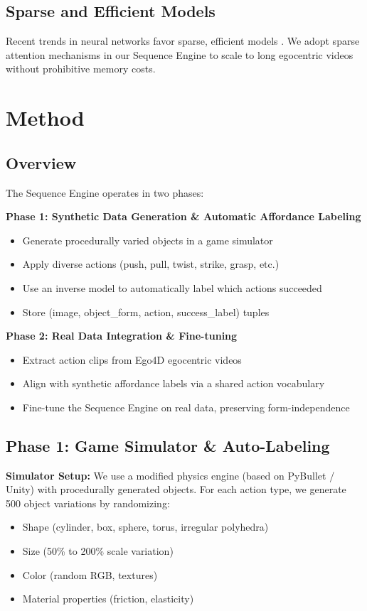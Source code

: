 \documentclass[11pt]{article}
\begin{document}
\subsection{Sparse and Efficient Models}

Recent trends in neural networks favor sparse, efficient models \cite{han2016deep, zhou2021efficient}. We adopt sparse attention mechanisms in our Sequence Engine to scale to long egocentric videos without prohibitive memory costs.

\section{Method}

\subsection{Overview}

The Sequence Engine operates in two phases:

\textbf{Phase 1: Synthetic Data Generation \& Automatic Affordance Labeling}
\begin{itemize}
    \item Generate procedurally varied objects in a game simulator
    \item Apply diverse actions (push, pull, twist, strike, grasp, etc.)
    \item Use an inverse model to automatically label which actions succeeded
    \item Store (image, object\_form, action, success\_label) tuples
\end{itemize}

\textbf{Phase 2: Real Data Integration \& Fine-tuning}
\begin{itemize}
    \item Extract action clips from Ego4D egocentric videos
    \item Align with synthetic affordance labels via a shared action vocabulary
    \item Fine-tune the Sequence Engine on real data, preserving form-independence
\end{itemize}

\subsection{Phase 1: Game Simulator \& Auto-Labeling}

\textbf{Simulator Setup:}
We use a modified physics engine (based on PyBullet / Unity) with procedurally generated objects. For each action type, we generate 500 object variations by randomizing:
\begin{itemize}
    \item Shape (cylinder, box, sphere, torus, irregular polyhedra)
    \item Size (50\% to 200\% scale variation)
    \item Color (random RGB, textures)
    \item Material properties (friction, elasticity)
\end{itemize}
\end{document}
